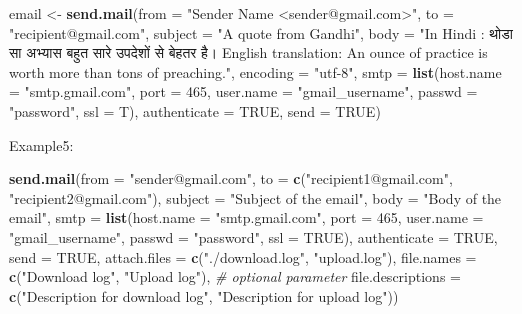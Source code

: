 \documentclass[]{book}
\newenvironment{Shaded}{\begin{snugshade}}{\end{snugshade}}
\newcommand{\KeywordTok}[1]{\textcolor[rgb]{0.13,0.29,0.53}{\textbf{#1}}}
\newcommand{\DataTypeTok}[1]{\textcolor[rgb]{0.13,0.29,0.53}{#1}}
\newcommand{\DecValTok}[1]{\textcolor[rgb]{0.00,0.00,0.81}{#1}}
\newcommand{\StringTok}[1]{\textcolor[rgb]{0.31,0.60,0.02}{#1}}
\newcommand{\CommentTok}[1]{\textcolor[rgb]{0.56,0.35,0.01}{\textit{#1}}}
\newcommand{\OtherTok}[1]{\textcolor[rgb]{0.56,0.35,0.01}{#1}}
\newcommand{\NormalTok}[1]{#1}
\begin{document}
\begin{Shaded}
\begin{Highlighting}[]

\NormalTok{email <-}\StringTok{ }\KeywordTok{send.mail}\NormalTok{(}\DataTypeTok{from =} \StringTok{"Sender Name <sender@gmail.com>"}\NormalTok{,}
                   \DataTypeTok{to =} \StringTok{"recipient@gmail.com"}\NormalTok{,}
                   \DataTypeTok{subject =} \StringTok{"A quote from Gandhi"}\NormalTok{,}
                   \DataTypeTok{body =} \StringTok{"In Hindi :  थोडा सा अभ्यास बहुत सारे उपदेशों से बेहतर है।}
\StringTok{                   English translation: An ounce of practice is worth more than tons of preaching."}\NormalTok{,}
                   \DataTypeTok{encoding =} \StringTok{"utf-8"}\NormalTok{,}
                   \DataTypeTok{smtp =} \KeywordTok{list}\NormalTok{(}\DataTypeTok{host.name =} \StringTok{"smtp.gmail.com"}\NormalTok{, }\DataTypeTok{port =} \DecValTok{465}\NormalTok{, }\DataTypeTok{user.name =} \StringTok{"gmail_username"}\NormalTok{, }\DataTypeTok{passwd =} \StringTok{"password"}\NormalTok{, }\DataTypeTok{ssl =}\NormalTok{ T),}
               \DataTypeTok{authenticate =} \OtherTok{TRUE}\NormalTok{,}
                   \DataTypeTok{send =} \OtherTok{TRUE}\NormalTok{)}
\end{Highlighting}
\end{Shaded}

Example5:

\begin{Shaded}
\begin{Highlighting}[]

\KeywordTok{send.mail}\NormalTok{(}\DataTypeTok{from =} \StringTok{"sender@gmail.com"}\NormalTok{,}
          \DataTypeTok{to =} \KeywordTok{c}\NormalTok{(}\StringTok{"recipient1@gmail.com"}\NormalTok{, }\StringTok{"recipient2@gmail.com"}\NormalTok{),}
          \DataTypeTok{subject =} \StringTok{"Subject of the email"}\NormalTok{,}
          \DataTypeTok{body =} \StringTok{"Body of the email"}\NormalTok{,}
          \DataTypeTok{smtp =} \KeywordTok{list}\NormalTok{(}\DataTypeTok{host.name =} \StringTok{"smtp.gmail.com"}\NormalTok{, }\DataTypeTok{port =} \DecValTok{465}\NormalTok{, }\DataTypeTok{user.name =} \StringTok{"gmail_username"}\NormalTok{, }\DataTypeTok{passwd =} \StringTok{"password"}\NormalTok{, }\DataTypeTok{ssl =} \OtherTok{TRUE}\NormalTok{),}
          \DataTypeTok{authenticate =} \OtherTok{TRUE}\NormalTok{,}
          \DataTypeTok{send =} \OtherTok{TRUE}\NormalTok{,}
          \DataTypeTok{attach.files =} \KeywordTok{c}\NormalTok{(}\StringTok{"./download.log"}\NormalTok{, }\StringTok{"upload.log"}\NormalTok{),}
          \DataTypeTok{file.names =} \KeywordTok{c}\NormalTok{(}\StringTok{"Download log"}\NormalTok{, }\StringTok{"Upload log"}\NormalTok{), }\CommentTok{# optional parameter}
          \DataTypeTok{file.descriptions =} \KeywordTok{c}\NormalTok{(}\StringTok{"Description for download log"}\NormalTok{, }\StringTok{"Description for upload log"}\NormalTok{))}
\end{Highlighting}
\end{Shaded}
\end{document}
